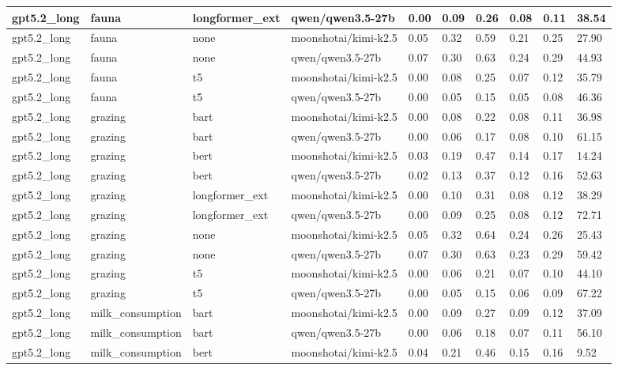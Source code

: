 \begin{tabular}{|l|l|l|l|l|l|l|l|l|l|}
 \hline
 gpt5.2\_long & fauna & longformer\_ext & qwen/qwen3.5-27b & 0.00 & 0.09 & 0.26 & 0.08 & 0.11 & 38.54 \\
 \hline
 gpt5.2\_long & fauna & none & moonshotai/kimi-k2.5 & 0.05 & 0.32 & 0.59 & 0.21 & 0.25 & 27.90 \\
 \hline
 gpt5.2\_long & fauna & none & qwen/qwen3.5-27b & 0.07 & 0.30 & 0.63 & 0.24 & 0.29 & 44.93 \\
 \hline
 gpt5.2\_long & fauna & t5 & moonshotai/kimi-k2.5 & 0.00 & 0.08 & 0.25 & 0.07 & 0.12 & 35.79 \\
 \hline
 gpt5.2\_long & fauna & t5 & qwen/qwen3.5-27b & 0.00 & 0.05 & 0.15 & 0.05 & 0.08 & 46.36 \\
 \hline
 gpt5.2\_long & grazing & bart & moonshotai/kimi-k2.5 & 0.00 & 0.08 & 0.22 & 0.08 & 0.11 & 36.98 \\
 \hline
 gpt5.2\_long & grazing & bart & qwen/qwen3.5-27b & 0.00 & 0.06 & 0.17 & 0.08 & 0.10 & 61.15 \\
 \hline
 gpt5.2\_long & grazing & bert & moonshotai/kimi-k2.5 & 0.03 & 0.19 & 0.47 & 0.14 & 0.17 & 14.24 \\
 \hline
 gpt5.2\_long & grazing & bert & qwen/qwen3.5-27b & 0.02 & 0.13 & 0.37 & 0.12 & 0.16 & 52.63 \\
 \hline
 gpt5.2\_long & grazing & longformer\_ext & moonshotai/kimi-k2.5 & 0.00 & 0.10 & 0.31 & 0.08 & 0.12 & 38.29 \\
 \hline
 gpt5.2\_long & grazing & longformer\_ext & qwen/qwen3.5-27b & 0.00 & 0.09 & 0.25 & 0.08 & 0.12 & 72.71 \\
 \hline
 gpt5.2\_long & grazing & none & moonshotai/kimi-k2.5 & 0.05 & 0.32 & 0.64 & 0.24 & 0.26 & 25.43 \\
 \hline
 gpt5.2\_long & grazing & none & qwen/qwen3.5-27b & 0.07 & 0.30 & 0.63 & 0.23 & 0.29 & 59.42 \\
 \hline
 gpt5.2\_long & grazing & t5 & moonshotai/kimi-k2.5 & 0.00 & 0.06 & 0.21 & 0.07 & 0.10 & 44.10 \\
 \hline
 gpt5.2\_long & grazing & t5 & qwen/qwen3.5-27b & 0.00 & 0.05 & 0.15 & 0.06 & 0.09 & 67.22 \\
 \hline
 gpt5.2\_long & milk\_consumption & bart & moonshotai/kimi-k2.5 & 0.00 & 0.09 & 0.27 & 0.09 & 0.12 & 37.09 \\
 \hline
 gpt5.2\_long & milk\_consumption & bart & qwen/qwen3.5-27b & 0.00 & 0.06 & 0.18 & 0.07 & 0.11 & 56.10 \\
 \hline
 gpt5.2\_long & milk\_consumption & bert & moonshotai/kimi-k2.5 & 0.04 & 0.21 & 0.46 & 0.15 & 0.16 & 9.52 \\

\end{tabular}
